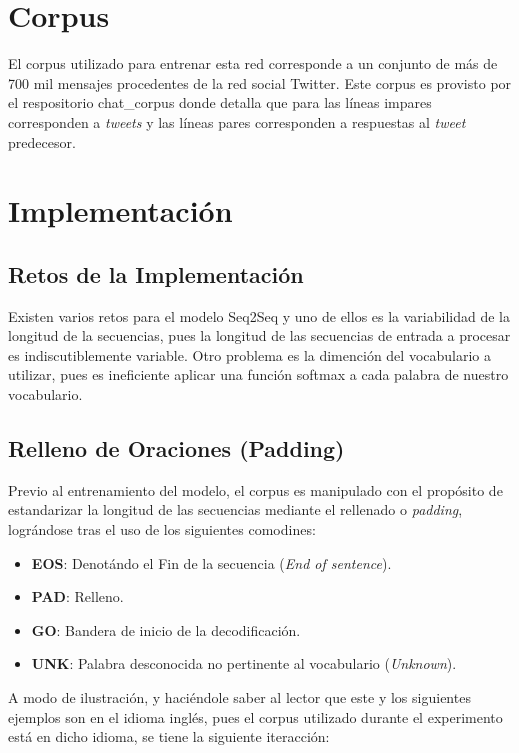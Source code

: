 \documentclass[12pt, letterpaper]{article}
\begin{document}
    \section{Corpus}
    El corpus utilizado para entrenar esta red corresponde a un conjunto de más de 700 mil mensajes procedentes de la red social Twitter. Este corpus es provisto por el respositorio chat\_corpus\cite{Ma_2020} donde detalla que para las líneas impares corresponden a \emph{tweets} y las líneas pares corresponden a respuestas al \emph{tweet} predecesor.

    \section{Implementación}

    \subsection{Retos de la Implementación}
    Existen varios retos para el modelo Seq2Seq y uno de ellos es la variabilidad de la longitud de la secuencias, pues la longitud de las secuencias de entrada a procesar es indiscutiblemente variable. Otro problema es la dimención del vocabulario a utilizar, pues es ineficiente aplicar una función softmax a cada palabra de nuestro vocabulario\cite{Ramamoorthy}.

    \subsection{Relleno de Oraciones (Padding)}
    Previo al entrenamiento del modelo, el corpus es manipulado con el propósito de estandarizar la longitud de las secuencias mediante el rellenado o \emph{padding}, lográndose tras el uso de los siguientes comodines:

    \begin{itemize}
        \item \textbf{EOS}: Denotándo el Fin de la secuencia (\emph{End of sentence}).
        \item \textbf{PAD}: Relleno.
        \item \textbf{GO}: Bandera de inicio de la decodificación.
        \item \textbf{UNK}: Palabra desconocida no pertinente al vocabulario (\emph{Unknown}).
    \end{itemize}

    A modo de ilustración, y haciéndole saber al lector que este y los siguientes ejemplos son en el idioma inglés, pues el corpus utilizado durante el experimento está en dicho idioma, se tiene la siguiente iteracción:
\end{document}
